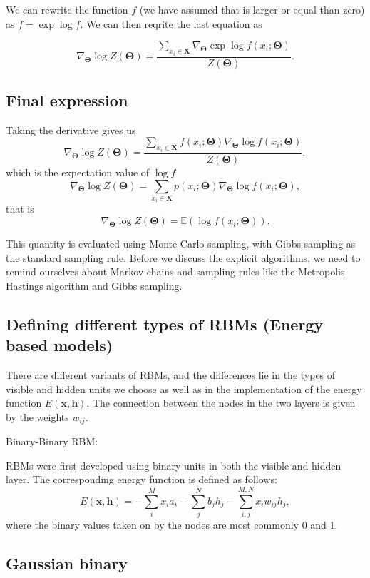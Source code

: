 \documentclass[%
oneside,                 %
final,                   %
10pt]{article}
\begin{document}
We can rewrite the function $f$ (we have assumed that is larger or
equal than zero) as $f=\exp{\log{f}}$. We can then reqrite the last
equation as

\[
\nabla_{\bm{\Theta}}\log{Z(\bm{\Theta})}=\frac{ \sum_{x_i\in \bm{X}} \nabla_{\bm{\Theta}}\exp{\log{f(x_i;\bm{\Theta})}}   }{Z(\bm{\Theta})}.
\]

\subsection{Final expression}

Taking the derivative gives us
\[
\nabla_{\bm{\Theta}}\log{Z(\bm{\Theta})}=\frac{ \sum_{x_i\in \bm{X}}f(x_i;\bm{\Theta}) \nabla_{\bm{\Theta}}\log{f(x_i;\bm{\Theta})}   }{Z(\bm{\Theta})}, 
\]
which is the expectation value of $\log{f}$
\[
\nabla_{\bm{\Theta}}\log{Z(\bm{\Theta})}=\sum_{x_i\in \bm{X}}p(x_i;\bm{\Theta}) \nabla_{\bm{\Theta}}\log{f(x_i;\bm{\Theta})},
\]
that is
\[
\nabla_{\bm{\Theta}}\log{Z(\bm{\Theta})}=\mathbb{E}(\log{f(x_i;\bm{\Theta})}).
\]

This quantity is evaluated using Monte Carlo sampling, with Gibbs
sampling as the standard sampling rule.  Before we discuss the
explicit algorithms, we need to remind ourselves about Markov chains
and sampling rules like the Metropolis-Hastings algorithm and Gibbs
sampling.

\subsection{Defining different types of RBMs (Energy based models)}

There are different variants of RBMs, and the differences lie in the types of visible and hidden units we choose as well as in the implementation of the energy function $E(\bm{x},\bm{h})$. The connection between the nodes in the two layers is given by the weights $w_{ij}$. 

\begin{block}{Binary-Binary RBM: }

RBMs were first developed using binary units in both the visible and hidden layer. The corresponding energy function is defined as follows:
\[
	E(\bm{x}, \bm{h}) = - \sum_i^M x_i a_i- \sum_j^N b_j h_j - \sum_{i,j}^{M,N} x_i w_{ij} h_j,
\]
where the binary values taken on by the nodes are most commonly 0 and 1.
\end{block}

\subsection{Gaussian binary}
\end{document}
